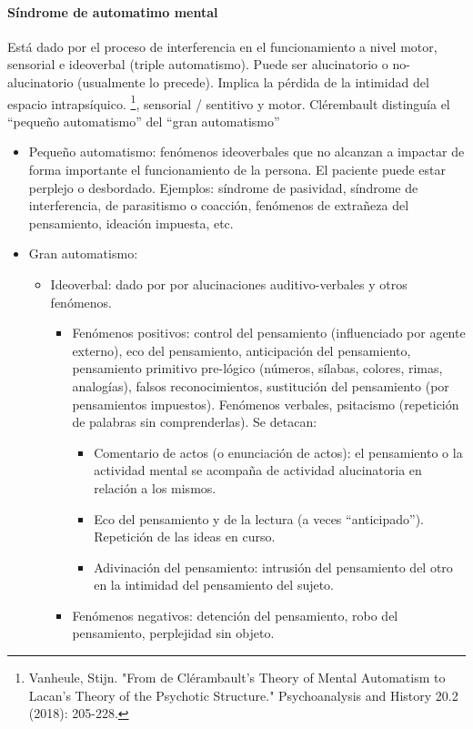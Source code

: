 \paragraph{Síndrome de automatimo mental}
Está dado por el proceso de interferencia en el funcionamiento a nivel motor, sensorial e ideoverbal (triple automatismo). Puede ser alucinatorio o no-alucinatorio (usualmente lo precede). Implica la pérdida de la intimidad del espacio intrapsíquico. \footnote{Vanheule, Stijn. "From de Clérambault's Theory of Mental Automatism to Lacan's Theory of the Psychotic Structure." Psychoanalysis and History 20.2 (2018): 205-228.}, sensorial / sentitivo y motor. Clérembault distinguía el ``pequeño automatismo'' del ``gran automatismo''
\begin{itemize}
    \item Pequeño automatismo: fenómenos ideoverbales que no alcanzan a impactar de forma importante el funcionamiento de la persona. El paciente puede estar perplejo o desbordado. Ejemplos: síndrome de pasividad, síndrome de interferencia, de parasitismo o coacción, fenómenos de extrañeza del pensamiento, ideación impuesta, etc.
    \item Gran automatismo:
    \begin{itemize}
        \item Ideoverbal: dado por por alucinaciones auditivo-verbales y otros fenómenos.
        \begin{itemize}
            \item Fenómenos positivos: control del pensamiento (influenciado por agente externo), eco del pensamiento, anticipación del pensamiento, pensamiento primitivo pre-lógico (números, sílabas, colores, rimas, analogías), falsos reconocimientos, sustitución del pensamiento (por pensamientos impuestos). Fenómenos verbales, psitacismo (repetición de palabras sin comprenderlas). Se detacan:
            \begin{itemize}
                \item Comentario de actos (o enunciación de actos): el pensamiento o la actividad mental se acompaña de actividad alucinatoria en relación a los mismos.
                \item Eco del pensamiento y de la lectura (a veces ``anticipado''). Repetición de las ideas en curso.
                \item Adivinación del pensamiento: intrusión del pensamiento del otro en la intimidad del pensamiento del sujeto.
            \end{itemize}
            \item Fenómenos negativos: detención del pensamiento, robo del pensamiento, perplejidad sin objeto.

\end{itemize}
\end{itemize}
\end{itemize}
